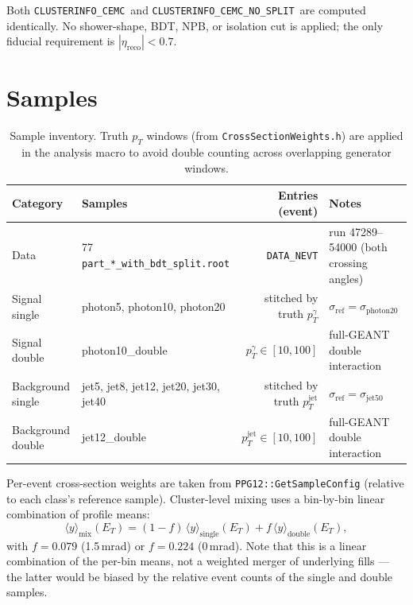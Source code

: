 \documentclass[11pt,a4paper]{article}
\newcommand{\splitnode}{\texttt{CLUSTERINFO\_CEMC}}
\newcommand{\nosplitnode}{\texttt{CLUSTERINFO\_CEMC\_NO\_SPLIT}}
\begin{document}
Both \splitnode\ and \nosplitnode\ are computed identically.  No
shower-shape, BDT, NPB, or isolation cut is applied; the only fiducial
requirement is $|\eta_{\mathrm{reco}}| < 0.7$.

\section{Samples}
\label{sec:samples}

\begin{table}[H]
\centering\small
\begin{tabular}{llrl}
\toprule
Category & Samples & Entries (event)& Notes\\
\midrule
Data               & 77 \texttt{part\_*\_with\_bdt\_split.root} & \texttt{DATA\_NEVT} &
  run 47289--54000 (both crossing angles)\\
Signal single      & photon5, photon10, photon20 & stitched by truth $p_T^\gamma$ &
  $\sigma_{\mathrm{ref}} = \sigma_{\mathrm{photon20}}$\\
Signal double      & photon10\_double & $p_T^\gamma \in [10,100]$ &
  full-GEANT double interaction\\
Background single  & jet5, jet8, jet12, jet20, jet30, jet40 &
  stitched by truth $p_T^{\mathrm{jet}}$ & $\sigma_{\mathrm{ref}} = \sigma_{\mathrm{jet50}}$\\
Background double  & jet12\_double & $p_T^{\mathrm{jet}} \in [10,100]$ &
  full-GEANT double interaction\\
\bottomrule
\end{tabular}
\caption{Sample inventory.  Truth $p_T$ windows (from
\texttt{CrossSectionWeights.h}) are applied in the analysis macro to avoid
double counting across overlapping generator windows.}
\end{table}

Per-event cross-section weights are taken from
\texttt{PPG12::GetSampleConfig} (relative to each class's reference
sample).  Cluster-level mixing uses a bin-by-bin linear combination of
profile means:
\begin{equation}
\langle y \rangle_{\mathrm{mix}}(E_T) =
(1-f)\, \langle y \rangle_{\mathrm{single}}(E_T) +
f\, \langle y \rangle_{\mathrm{double}}(E_T),
\label{eq:blend}
\end{equation}
with $f = 0.079$ (1.5\,mrad) or $f = 0.224$ (0\,mrad).  Note that this
is a linear combination of the per-bin means, not a weighted merger of
underlying fills --- the latter would be biased by the relative
event counts of the single and double samples.
\end{document}
